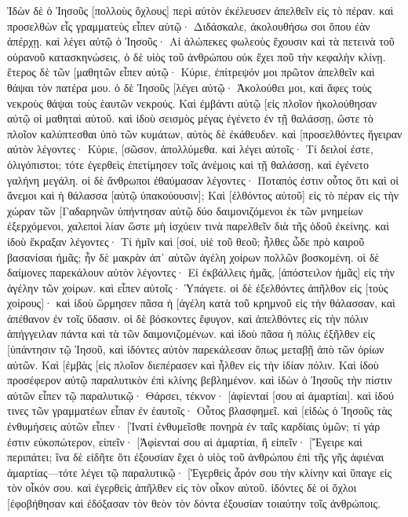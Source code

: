 Ἰδὼν δὲ ὁ Ἰησοῦς [πολλοὺς ὄχλους] περὶ αὐτὸν ἐκέλευσεν ἀπελθεῖν εἰς τὸ πέραν. 
καὶ προσελθὼν εἷς γραμματεὺς εἶπεν αὐτῷ· Διδάσκαλε, ἀκολουθήσω σοι ὅπου ἐὰν ἀπέρχῃ. 
καὶ λέγει αὐτῷ ὁ Ἰησοῦς· Αἱ ἀλώπεκες φωλεοὺς ἔχουσιν καὶ τὰ πετεινὰ τοῦ οὐρανοῦ κατασκηνώσεις, ὁ δὲ υἱὸς τοῦ ἀνθρώπου οὐκ ἔχει ποῦ τὴν κεφαλὴν κλίνῃ. 
ἕτερος δὲ τῶν [μαθητῶν εἶπεν αὐτῷ· Κύριε, ἐπίτρεψόν μοι πρῶτον ἀπελθεῖν καὶ θάψαι τὸν πατέρα μου. 
ὁ δὲ Ἰησοῦς [λέγει αὐτῷ· Ἀκολούθει μοι, καὶ ἄφες τοὺς νεκροὺς θάψαι τοὺς ἑαυτῶν νεκρούς. 
Καὶ ἐμβάντι αὐτῷ [εἰς πλοῖον ἠκολούθησαν αὐτῷ οἱ μαθηταὶ αὐτοῦ. 
καὶ ἰδοὺ σεισμὸς μέγας ἐγένετο ἐν τῇ θαλάσσῃ, ὥστε τὸ πλοῖον καλύπτεσθαι ὑπὸ τῶν κυμάτων, αὐτὸς δὲ ἐκάθευδεν. 
καὶ [προσελθόντες ἤγειραν αὐτὸν λέγοντες· Κύριε, [σῶσον, ἀπολλύμεθα. 
καὶ λέγει αὐτοῖς· Τί δειλοί ἐστε, ὀλιγόπιστοι; τότε ἐγερθεὶς ἐπετίμησεν τοῖς ἀνέμοις καὶ τῇ θαλάσσῃ, καὶ ἐγένετο γαλήνη μεγάλη. 
οἱ δὲ ἄνθρωποι ἐθαύμασαν λέγοντες· Ποταπός ἐστιν οὗτος ὅτι καὶ οἱ ἄνεμοι καὶ ἡ θάλασσα [αὐτῷ ὑπακούουσιν]; 
Καὶ [ἐλθόντος αὐτοῦ] εἰς τὸ πέραν εἰς τὴν χώραν τῶν [Γαδαρηνῶν ὑπήντησαν αὐτῷ δύο δαιμονιζόμενοι ἐκ τῶν μνημείων ἐξερχόμενοι, χαλεποὶ λίαν ὥστε μὴ ἰσχύειν τινὰ παρελθεῖν διὰ τῆς ὁδοῦ ἐκείνης. 
καὶ ἰδοὺ ἔκραξαν λέγοντες· Τί ἡμῖν καὶ [σοί, υἱὲ τοῦ θεοῦ; ἦλθες ὧδε πρὸ καιροῦ βασανίσαι ἡμᾶς; 
ἦν δὲ μακρὰν ἀπ᾽ αὐτῶν ἀγέλη χοίρων πολλῶν βοσκομένη. 
οἱ δὲ δαίμονες παρεκάλουν αὐτὸν λέγοντες· Εἰ ἐκβάλλεις ἡμᾶς, [ἀπόστειλον ἡμᾶς] εἰς τὴν ἀγέλην τῶν χοίρων. 
καὶ εἶπεν αὐτοῖς· Ὑπάγετε. οἱ δὲ ἐξελθόντες ἀπῆλθον εἰς [τοὺς χοίρους]· καὶ ἰδοὺ ὥρμησεν πᾶσα ἡ [ἀγέλη κατὰ τοῦ κρημνοῦ εἰς τὴν θάλασσαν, καὶ ἀπέθανον ἐν τοῖς ὕδασιν. 
οἱ δὲ βόσκοντες ἔφυγον, καὶ ἀπελθόντες εἰς τὴν πόλιν ἀπήγγειλαν πάντα καὶ τὰ τῶν δαιμονιζομένων. 
καὶ ἰδοὺ πᾶσα ἡ πόλις ἐξῆλθεν εἰς [ὑπάντησιν τῷ Ἰησοῦ, καὶ ἰδόντες αὐτὸν παρεκάλεσαν ὅπως μεταβῇ ἀπὸ τῶν ὁρίων αὐτῶν. 
Καὶ [ἐμβὰς [εἰς πλοῖον διεπέρασεν καὶ ἦλθεν εἰς τὴν ἰδίαν πόλιν. 
Καὶ ἰδοὺ προσέφερον αὐτῷ παραλυτικὸν ἐπὶ κλίνης βεβλημένον. καὶ ἰδὼν ὁ Ἰησοῦς τὴν πίστιν αὐτῶν εἶπεν τῷ παραλυτικῷ· Θάρσει, τέκνον· [ἀφίενταί [σου αἱ ἁμαρτίαι]. 
καὶ ἰδού τινες τῶν γραμματέων εἶπαν ἐν ἑαυτοῖς· Οὗτος βλασφημεῖ. 
καὶ [εἰδὼς ὁ Ἰησοῦς τὰς ἐνθυμήσεις αὐτῶν εἶπεν· [Ἱνατί ἐνθυμεῖσθε πονηρὰ ἐν ταῖς καρδίαις ὑμῶν; 
τί γάρ ἐστιν εὐκοπώτερον, εἰπεῖν· [Ἀφίενταί σου αἱ ἁμαρτίαι, ἢ εἰπεῖν· [Ἔγειρε καὶ περιπάτει; 
ἵνα δὲ εἰδῆτε ὅτι ἐξουσίαν ἔχει ὁ υἱὸς τοῦ ἀνθρώπου ἐπὶ τῆς γῆς ἀφιέναι ἁμαρτίας—τότε λέγει τῷ παραλυτικῷ· [Ἐγερθεὶς ἆρόν σου τὴν κλίνην καὶ ὕπαγε εἰς τὸν οἶκόν σου. 
καὶ ἐγερθεὶς ἀπῆλθεν εἰς τὸν οἶκον αὐτοῦ. 
ἰδόντες δὲ οἱ ὄχλοι [ἐφοβήθησαν καὶ ἐδόξασαν τὸν θεὸν τὸν δόντα ἐξουσίαν τοιαύτην τοῖς ἀνθρώποις. 
